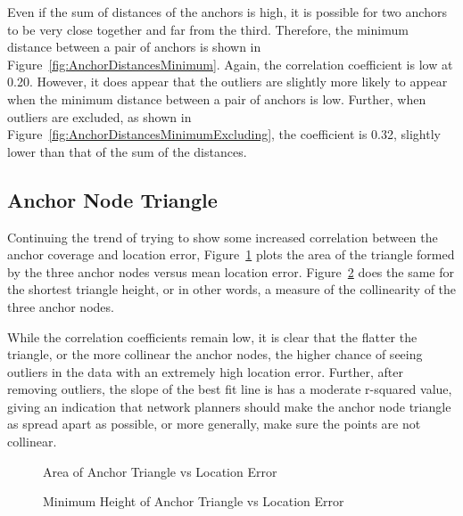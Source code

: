 Even if the sum of distances of the anchors is high, it is possible for two anchors to be very close together and far from the third.  Therefore, the minimum distance between a pair of anchors is shown in Figure~\ref{fig:AnchorDistancesMinimum}.  Again, the correlation coefficient is low at 0.20.  However, it does appear that the outliers are slightly more likely to appear when the minimum distance between a pair of anchors is low.  Further, when outliers are excluded, as shown in Figure~\ref{fig:AnchorDistancesMinimumExcluding}, the coefficient is 0.32, slightly lower than that of the sum of the distances.

\subsection{Anchor Node Triangle}
\label{sec:anchorTriangle}
Continuing the trend of trying to show some increased correlation between the anchor coverage and location error, Figure~\ref{fig:AnchorArea} plots the area of the triangle formed by the three anchor nodes versus mean location error. Figure~\ref{fig:AnchorHeight} does the same for the shortest triangle height, or in other words, a measure of the collinearity of the three anchor nodes.

While the correlation coefficients remain low, it is clear that the flatter the triangle, or the more collinear the anchor nodes, the higher chance of seeing outliers in the data with an extremely high location error. Further, after removing outliers, the slope of the best fit line is has a moderate r-squared value, giving an indication that network planners should make the anchor node triangle as spread apart as possible, or more generally, make sure the points are not collinear.

\begin{figure}
  \centering
	\caption{Area of Anchor Triangle vs Location Error}	    
	\label{fig:AnchorArea}
\end{figure}

\begin{figure}
  \centering
	\caption{Minimum Height of Anchor Triangle vs Location Error}	    
	\label{fig:AnchorHeight}
\end{figure}

